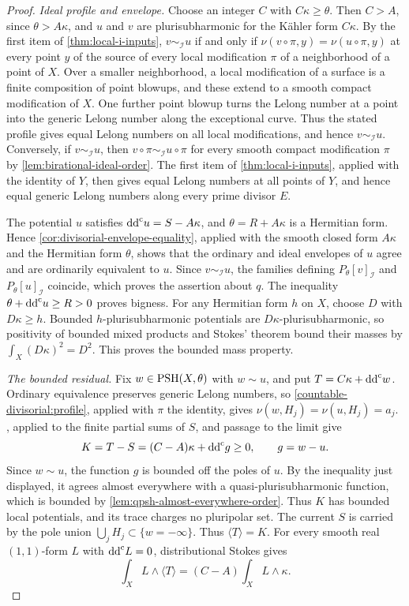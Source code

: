 \begin{proof}
\emph{Ideal profile and envelope.} Choose an integer $C$
with $C\kappa\geq\theta$. Then $C>A$, since $\theta>A\kappa$,
and $u$ and $v$ are plurisubharmonic for the K\"ahler form
$C\kappa$. By the first item of \cref{thm:local-i-inputs},
$v\sim_{\mathcal I}u$ if and only if $\nu(v\circ\pi,y)=\nu(u\circ\pi,y)$
at every point $y$ of the source of every local modification
$\pi$ of a neighborhood of a point of $X$. Over a smaller neighborhood, a local modification of a surface is
a finite composition of point blowups, and these extend to a
smooth compact modification of $X$. One further point blowup turns
the Lelong number at a point into the generic Lelong number along
the exceptional curve. Thus the stated profile gives equal Lelong
numbers on all local modifications, and hence $v\sim_{\mathcal I}u$.
Conversely, if $v\sim_{\mathcal I}u$, then
$v\circ\pi\sim_{\mathcal I}u\circ\pi$ for every smooth compact
modification $\pi$ by \cref{lem:birational-ideal-order}. The first
item of \cref{thm:local-i-inputs}, applied with the identity of $Y$,
then gives equal Lelong numbers at all points of $Y$, and hence
equal generic Lelong numbers along every prime divisor $E$.

The potential $u$ satisfies $\mathrm{dd}^{\mathrm{c}} u=S-A\kappa$, and $\theta=R+A\kappa$
is a Hermitian form. Hence \cref{cor:divisorial-envelope-equality},
applied with the smooth closed form $A\kappa$ and the Hermitian form
$\theta$, shows that the ordinary and ideal envelopes of $u$ agree
and are ordinarily equivalent to $u$.
Since $v\sim_{\mathcal I}u$, the families defining
$P_\theta[v]_{\mathcal I}$ and $P_\theta[u]_{\mathcal I}$ coincide,
which proves the assertion about $q$. The inequality
$\theta+\mathrm{dd}^{\mathrm{c}} u\geq R>0$ proves
bigness. For any Hermitian form $h$ on $X$, choose $D$ with
$D\kappa\geq h$. Bounded $h$-plurisubharmonic potentials are
$D\kappa$-plurisubharmonic, so positivity of bounded mixed
products and Stokes' theorem bound their masses by $\int_X(D\kappa)^2=D^2$.
This proves the bounded mass property.

\emph{The bounded residual.} Fix $w\in\mathrm{PSH}(X,\theta)$ with
$w\sim u$, and put $T=C\kappa+\mathrm{dd}^{\mathrm{c}} w$. Ordinary equivalence
preserves generic Lelong numbers, so \cref{countable-divisorial:profile},
applied with $\pi$ the identity, gives $\nu(w,H_j)=\nu(u,H_j)=a_j$.
, applied to the finite partial
sums of $S$, and passage to the limit give
\[
 K=T-S=(C-A)\kappa+\mathrm{dd}^{\mathrm{c}} g\geq0,\qquad g=w-u.
\]
Since $w\sim u$, the function $g$ is bounded off the poles of $u$.
By the inequality just displayed, it agrees almost everywhere with a
quasi-plurisubharmonic function, which is bounded by
\cref{lem:qpsh-almost-everywhere-order}. Thus $K$
has bounded local potentials, and its trace charges no
pluripolar set. The current $S$ is carried by the pole
union $\bigcup_jH_j\subset\{w=-\infty\}$. Thus
$\langle T\rangle=K$. For every smooth real $(1,1)$-form $L$
with $\mathrm{dd}^{\mathrm{c}} L=0$, distributional Stokes gives
\[
 \int_X L\wedge\langle T\rangle
       =(C-A)\int_XL\wedge\kappa.
\]


\end{proof}
